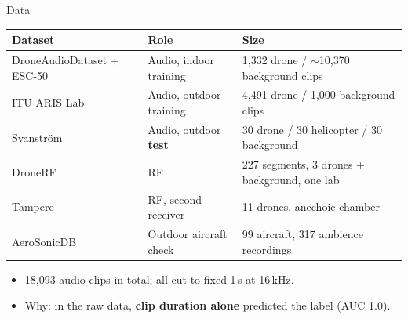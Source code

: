 \documentclass[aspectratio=169,11pt]{beamer}
\begin{document}
\begin{frame}{Data}
\small
\begin{tabular}{@{}lll@{}}
\toprule
Dataset & Role & Size \\
\midrule
DroneAudioDataset + ESC-50 & Audio, indoor training & 1,332 drone / $\sim$10,370 background clips \\
ITU ARIS Lab & Audio, outdoor training & 4,491 drone / 1,000 background clips \\
Svanstr\"om & Audio, outdoor \textbf{test} & 30 drone / 30 helicopter / 30 background \\
DroneRF & RF & 227 segments, 3 drones + background, one lab \\
Tampere & RF, second receiver & 11 drones, anechoic chamber \\
AeroSonicDB & Outdoor aircraft check & 99 aircraft, 317 ambience recordings \\
\bottomrule
\end{tabular}
\vspace{6pt}
\begin{itemize}\small
  \item 18,093 audio clips in total; all cut to fixed 1\,s at 16\,kHz.
  \item Why: in the raw data, \textbf{clip duration alone} predicted the label (AUC 1.0).
\end{itemize}
\end{frame}
\end{document}
